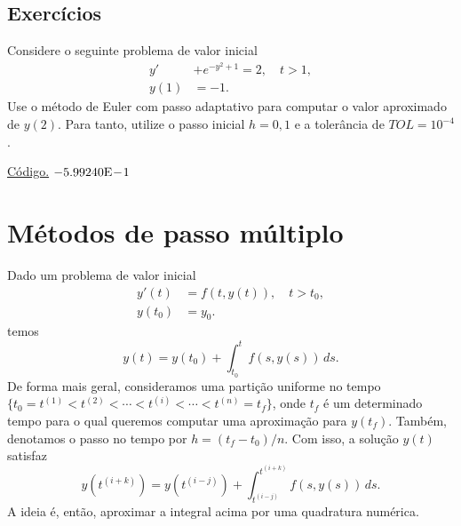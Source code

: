 \subsection*{Exercícios}

\begin{exer}
  Considere o seguinte problema de valor inicial
  \begin{align}
    y' &+ e^{-y^2+1} = 2,\quad t>1,\\
    y(1) &= -1.
  \end{align}
Use o método de Euler com passo adaptativo para computar o valor aproximado de $y(2)$. Para tanto, utilize o passo inicial $h=0,1$ e a tolerância de $TOL=10^{-4}$.
\end{exer}
\begin{resp}
  \ifisoctave 
  \href{https://github.com/phkonzen/notas/blob/master/src/MatematicaNumerica/cap_integr/dados/exer_Euler_adap/exer_Euler_adap.m}{Código.} 
  \fi
  $-5.99240\mathrm{E}\!-\!1$
\end{resp}


\section{Métodos de passo múltiplo}\label{cap_pvi_sec_passo_mult}

Dado um problema de valor inicial
\begin{align}
  y'(t) &= f(t,y(t)),\quad t>t_0,\\
  y(t_0) &= y_0.
\end{align}
temos
\begin{equation}
  y(t) = y(t_0) + \int_{t_0}^t f(s,y(s))\,ds.
\end{equation}
De forma mais geral, consideramos uma partição uniforme no tempo $\{t_0=t^{(1)} < t^{(2)} < \cdots < t^{(i)} < \cdots < t^{(n)}=t_f\}$, onde $t_f$ é um determinado tempo para o qual queremos computar uma aproximação para $y(t_f)$. Também, denotamos o passo no tempo por $h=(t_f-t_0)/n$. Com isso, a solução $y(t)$ satisfaz
\begin{equation}
  y\left(t^{(i+k)}\right) = y\left(t^{(i-j)}\right) + \int_{t^{(i-j)}}^{t^{(i+k)}} f(s,y(s))\,ds.
\end{equation}
A ideia é, então, aproximar a integral acima por uma quadratura numérica.

